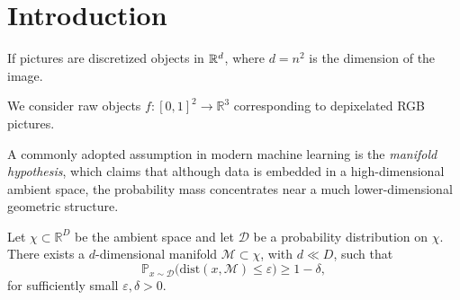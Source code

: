 \documentclass{article}
\begin{document}





\section{Introduction}

If pictures are discretized objects in $\mathbb{R}^{d}$, where $d=n^2$ is the dimension of the image.

We consider raw objects $f:[0,1]^2\to \mathbb{R}^3$ corresponding to depixelated RGB pictures.



A commonly adopted assumption in modern machine learning is the \emph{manifold hypothesis}, which claims that although data is embedded in a high-dimensional ambient space, the probability mass concentrates near a much lower-dimensional geometric structure.

\begin{assumption}
	Let $\chi \subset \mathbb{R}^D$ be the ambient space and let $\mathcal{D}$ be a probability distribution on $\chi$.
	There exists a $d$-dimensional manifold $\mathcal{M} \subset \chi$, with $d \ll D$, such that
	\[
		\mathbb{P}_{x \sim \mathcal{D}}\big( \mathrm{dist}(x,\mathcal{M}) \le \varepsilon \big) \ge 1 - \delta,
	\]
	for sufficiently small $\varepsilon, \delta > 0$.
\end{assumption}
\end{document}

